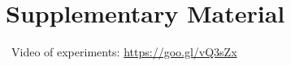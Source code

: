 \chapter*{Supplementary Material} \label{supplementary}
\
Video of experiments: 
\url{https://goo.gl/vQ3sZx}
